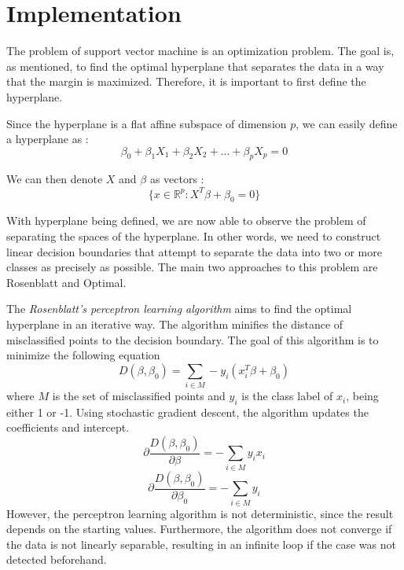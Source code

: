 \section{Implementation}
The problem of support vector machine is an optimization problem. The goal is, as mentioned, 
to find the optimal hyperplane that separates the data in a way that the margin is maximized.
Therefore, it is important to first define the hyperplane.

Since the hyperplane is a flat affine subspace of dimension $p$, we can easily define a hyperplane as \cite{R9}: 
\begin{equation}
    \beta_0 + \beta_1X_1 + \beta_2X_2 + ... + \beta_pX_p = 0
\end{equation}

We can then denote $X$ and $\beta$ as vectors \cite{Elements12}: 
\begin{equation}
    \{x \in \mathbb{R}^p: X^T \beta + \beta_0 = 0\}
\end{equation}

With hyperplane being defined, we are now able to observe the problem of separating the spaces of the hyperplane. 
In other words, we need to construct linear decision
boundaries that attempt to separate the data into two or more classes as precisely as possible. 
The main two approaches to this problem are Rosenblatt and Optimal.

The \emph{Rosenblatt's perceptron learning algorithm} aims to find the optimal hyperplane in an iterative way. The algorithm minifies
the distance of misclassified points to the decision boundary. The goal of this algorithm is to minimize the following equation
\begin{equation}
    D(\beta, \beta_0) = \sum_{i\in M} -y_i(x_i^T \beta + \beta_0)
\end{equation}
where $M$ is the set of misclassified points and $y_i$ is the class label of $x_i$, being either 1 or -1. Using stochastic gradient
descent, the algorithm updates the coefficients and intercept. 
\begin{equation}
    \partial\frac{D(\beta, \beta_0)}{\partial\beta} = -\sum_{i\in M} y_ix_i
\end{equation}
\begin{equation}
    \partial\frac{D(\beta, \beta_0)}{\partial\beta_0} = -\sum_{i\in M} y_i
\end{equation}
However, the perceptron learning algorithm is not deterministic, since
the result depends on the starting values. Furthermore, the algorithm does not converge if the data is not linearly separable, resulting
in an infinite loop if the case was not detected beforehand. \cite{Elements4}

